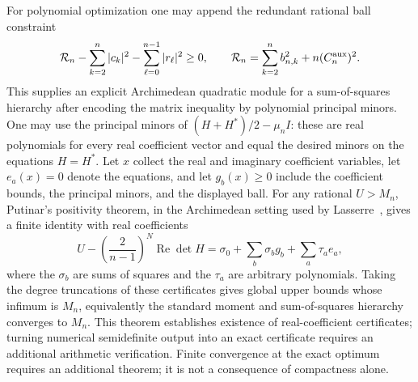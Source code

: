 \documentclass[11pt]{article}
\theoremstyle{remark}
\numberwithin{equation}{section}
\begin{document}
For polynomial optimization one may append the redundant rational ball
constraint
\[
 \mathcal R_n-\sum_{k=2}^n|c_k|^2-\sum_{\ell=0}^{n-1}|r_\ell|^2\ge0,
 \qquad\mathcal R_n=\sum_{k=2}^nb_{n,k}^2+n(C_n^{\rm aux})^2.
\]
This supplies an explicit Archimedean quadratic module for a sum-of-squares
hierarchy after encoding the matrix inequality by polynomial principal
minors.  One may use the principal minors of
$(H+H^*)/2-\mu_n I$: these are real polynomials for every real coefficient
vector and equal the desired minors on the equations $H=H^*$.
Let $x$ collect the real and imaginary coefficient variables,
let $e_a(x)=0$ denote the equations, and let $g_b(x)\ge0$ include
the coefficient bounds, the principal minors, and the displayed ball.
For any rational $U>M_n$, Putinar's positivity theorem, in the
Archimedean setting used by Lasserre~\cite{Lasserre}, gives a finite
identity with real coefficients
\[
 U-\left(\frac2{n-1}\right)^N\operatorname{Re}\det H
 =\sigma_0+\sum_b\sigma_b g_b+\sum_a\tau_a e_a,
\]
where the $\sigma_b$ are sums of squares and the $\tau_a$ are arbitrary
polynomials.  Taking the degree truncations of these certificates gives
global upper bounds whose infimum is $M_n$, equivalently the standard
moment and sum-of-squares hierarchy converges to $M_n$.
This theorem establishes existence of real-coefficient certificates;
turning numerical semidefinite output into an exact certificate requires
an additional arithmetic verification.
Finite convergence at the exact optimum requires an additional theorem;
it is not a consequence of compactness alone.
\end{document}

